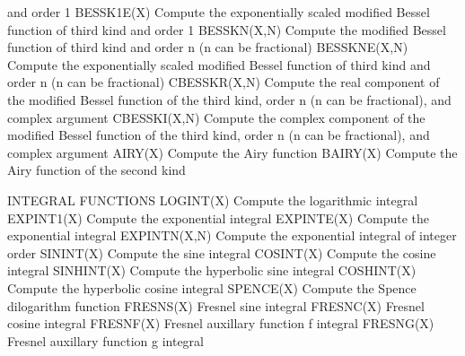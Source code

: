                   and order 1
   BESSK1E(X)     Compute the exponentially scaled modified Bessel
                  function of third kind and order 1
   BESSKN(X,N)    Compute the modified Bessel function of third kind
                  and order n (n can be fractional)
   BESSKNE(X,N)   Compute the exponentially scaled modified Bessel
                  function of third kind and order n (n can be
                  fractional)
   CBESSKR(X,N)   Compute the real component of the modified Bessel
                  function of the third kind, order n (n can be
                  fractional), and complex argument
   CBESSKI(X,N)   Compute the complex component of the modified Bessel
                  function of the third kind, order n (n can be
                  fractional), and complex argument
   AIRY(X)        Compute the Airy function
   BAIRY(X)       Compute the Airy function of the second kind
 
INTEGRAL FUNCTIONS
   LOGINT(X)      Compute the logarithmic integral
   EXPINT1(X)     Compute the exponential integral
   EXPINTE(X)     Compute the exponential integral
   EXPINTN(X,N)   Compute the exponential integral of integer order
   SININT(X)      Compute the sine integral
   COSINT(X)      Compute the cosine integral
   SINHINT(X)     Compute the hyperbolic sine integral
   COSHINT(X)     Compute the hyperbolic cosine integral
   SPENCE(X)      Compute the Spence dilogarithm function
   FRESNS(X)      Fresnel sine integral
   FRESNC(X)      Fresnel cosine integral
   FRESNF(X)      Fresnel auxillary function f integral
   FRESNG(X)      Fresnel auxillary function g integral
 
